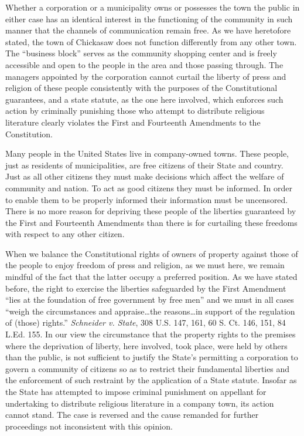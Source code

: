 Whether a corporation or a municipality owns or possesses the town the public in
either case has an identical interest in the functioning of the community in
such manner that the channels of communication remain free. As we have
heretofore stated, the town of Chickasaw does not function differently from any
other town. The ``business block'' serves as the community shopping center and
is
freely accessible and open to the people in the area and those passing through.
The managers appointed by the corporation cannot curtail the liberty of press
and religion of these people consistently with the purposes of the
Constitutional guarantees, and a state statute, as the one here involved, which
enforces such action by criminally punishing those who attempt to distribute
religious literature clearly violates the First and Fourteenth Amendments to
the Constitution.

Many people in the United States live in company-owned towns.  These people,
just as residents of municipalities, are free citizens of their State and
country. Just as all other citizens they must make decisions which affect the
welfare of community and nation. To act as good citizens they must be informed.
In order to enable them to be properly informed their information must be
uncensored. There is no more reason for depriving these people of the liberties
guaranteed by the First and Fourteenth Amendments than there is for
curtailing these freedoms with respect to any other citizen.

When we balance the Constitutional rights of owners of property against those of
the people to enjoy freedom of press and religion, as we must here, we remain
mindful of the fact that the latter occupy a preferred position.  As we have
stated before, the right to exercise the liberties safeguarded by the First
Amendment ``lies at the foundation of free government by free men'' and we must
in all cases ``weigh the circumstances and appraise\ldots the reasons\ldots in
support of the regulation of (those) rights.'' \textit{Schneider v. State}, 308
U.S. 147, 161, 60 S. Ct. 146, 151, 84 L.Ed. 155. In our view the circumstance
that the property rights to the premises where the deprivation of liberty, here
involved, took place, were held by others than the public, is not sufficient to
justify the State's permitting a corporation to govern a community of citizens
so as to restrict their fundamental liberties and the enforcement of such
restraint by the application of a State statute. Insofar as the State has
attempted to impose criminal punishment on appellant for undertaking to
distribute religious literature in a company town, its action cannot stand. The
case is reversed and the cause remanded for further proceedings not
inconsistent with this opinion.

